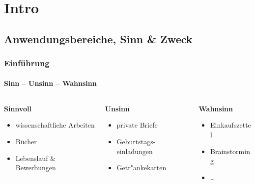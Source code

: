 \section{Intro}

\subsection{Anwendungsbereiche, Sinn \& Zweck}
\begin{frame}[t]
\frametitle{Einführung}
\framesubtitle{Sinn -- Unsinn -- Wahnsinn}
\bigskip
\bigskip
\bigskip

\begin{columns}[t]
\begin{column}{.3\textwidth}
\textbf{Sinnvoll}\\[3mm]
\begin{itemize}
\item wissenschaftliche Arbeiten
\item Bücher
\item Lebenslauf \& Bewerbungen
\end{itemize}
\end{column}
\begin{column}{.30\textwidth}
\textbf{Unsinn}\\[3mm]
\begin{itemize}
\item private Briefe
\item Geburtstags-einladungen
\item Getr"ankekarten
\end{itemize}
\end{column}
\begin{column}{.3\textwidth}
\textbf{Wahnsinn}\\[3mm]
\begin{itemize}
\item Einkaufszettel
\item Brainstorming
\item \ldots
\end{itemize}
\end{column}
\end{columns}
\end{frame}


